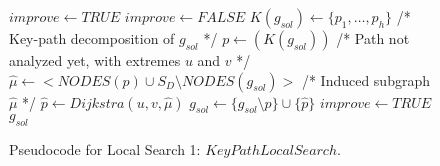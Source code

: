 \documentclass{llncs}
\begin{document}
\begin{figure}[H]
\begin{algorithm}[H]
\caption{$g_{sol} = KeyPathLocalSearch(G_B,C,g_{sol})$}
\begin{algorithmic}[1]
\STATE $improve \leftarrow TRUE$
\STATE $improve \leftarrow FALSE$
\STATE $K(g_{sol}) \leftarrow \{p_1,\ldots,p_h\}$ /* Key-path decomposition of $g_{sol}$ */
\STATE $p \leftarrow(K(g_{sol}))$ /* Path not analyzed yet, with extremes $u$ and $v$ */
\STATE $\hat{\mu} \leftarrow <NODES(p) \cup S_D\setminus NODES(g_{sol}) > $ /* Induced subgraph $\hat{\mu}$ */
\STATE $\hat{p} \leftarrow Dijkstra(u,v,\hat{\mu})$
\STATE $g_{sol} \leftarrow \{ g_{sol}\setminus p \} \cup \{\hat{p}\}$
\STATE $improve \leftarrow TRUE$
\ENDIF
\ENDWHILE
\ENDWHILE
\RETURN $g_{sol}$
\end{algorithmic}
\end{algorithm}
\caption{Pseudocode for Local Search 1: $KeyPathLocalSearch$.\label{alg-kpls}}
\end{figure}

%
%
\end{document}
